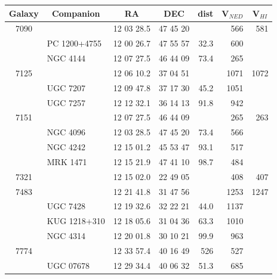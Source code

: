 \documentclass{aa}
\newcounter{dummyyoyo}
\begin{document}
\setcounter{table}{\thedummyyoyo}

\begin{center}
\begin{table}
\begin{center}
\begin{tabular}{|c|l|c|c|r|r|r|}
\hline
Galaxy & \multicolumn{1}{c|}{Companion} & RA & DEC & \multicolumn{1}{c|}{dist} & \multicolumn{1}{c|}{V$_{NED}$} & \multicolumn{1}{c|}{V$_{HI}$} \\
\hline\hline
7090  &                          & 12 03 28.5 & 47 45 20   &        &   566  &   581\\
      & PC 1200+4755\hspace{18mm} & 12 00 26.7 & 47 55 57   &   32.3 &   600  &   \\
      & NGC 4144                 & 12 07 27.5 & 46 44 09   &   73.4 &   265 & \\
\hline
7125  &                          & 12 06 10.2 & 37 04 51   &        &   1071 &   1072\\
      & UGC 7207                 & 12 09 47.8 & 37 17 30   &   45.2 &   1051 & \\
      & UGC 7257                 & 12 12 32.1 & 36 14 13   &   91.8 &   942 & \\
\hline
7151  &                          & 12 07 27.5 & 46 44 09   &        &   265  &   263\\
      & NGC 4096                 & 12 03 28.5 & 47 45 20   &   73.4 &   566 & \\
      & NGC 4242                 & 12 15 01.2 & 45 53 47   &   93.1 &   517 & \\
      & MRK 1471                 & 12 15 21.9 & 47 41 10   &   98.7 &   484 & \\
\hline
7321  &                          & 12 15 02.0 & 22 49 05   &        &   408  &   407\\
\hline
7483  &                          & 12 21 41.8 & 31 47 56   &        &   1253 &   1247\\
      & UGC 7428                 & 12 19 32.6 & 32 22 21   &   44.0 &   1137 &       \\
      & KUG 1218+310             & 12 18 05.6 & 31 04 36   &   63.3 &   1010 &       \\
      & NGC 4314                 & 12 20 01.8 & 30 10 21   &   99.9 &   963  &       \\
\hline
7774  &                          & 12 33 57.4 & 40 16 49   &   526  &   527  &       \\
      & UGC 07678                & 12 29 34.4 & 40 06 32   &   51.3 &   685  &       \\

\end{tabular}
\end{center}
\end{table}
\end{center}
\end{document}
